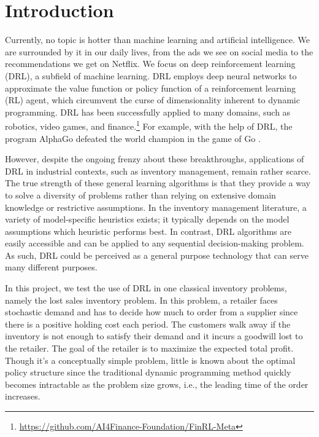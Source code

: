 
\section{Introduction}\label{intro}
Currently, no topic is hotter than machine learning and artificial intelligence. We are surrounded by it in our daily lives, from the ads we see on social media to the recommendations we get on Netflix. We focus on deep reinforcement learning (DRL), a subfield of machine learning. DRL employs deep neural networks to approximate the value function or policy function of a reinforcement learning (RL) agent, which circumvent the curse of dimensionality inherent to dynamic programming. DRL has been successfully applied to many domains, such as robotics, video games, and finance.\footnote{\url{https://github.com/AI4Finance-Foundation/FinRL-Meta}} For example, with the help of DRL, the program AlphaGo defeated the world champion in the game of Go \citep{silver_mastering_2016}.

However, despite the ongoing frenzy about these breakthroughs, applications of DRL in industrial contexts, such as inventory management, remain rather scarce. The true strength of these general learning algorithms is that they provide a way to solve a diversity of problems rather than relying on extensive domain knowledge or restrictive assumptions. In the inventory management literature, a variety of model-specific heuristics exists; it typically depends on the model assumptions which heuristic performs best. In contrast, DRL algorithms are easily accessible and can be applied to any sequential decision-making problem. As such, DRL could be perceived as a general purpose technology that can serve many different purposes.

In this project, we test the use of DRL in one classical inventory problems, namely the lost sales inventory problem. In this problem, a retailer faces stochastic demand and has to decide how much to order from a supplier since there is a positive holding cost each period. The customers walk away if the inventory is not enough to satisfy their demand and it incurs a goodwill lost to the retailer. The goal of the retailer is to maximize the expected total profit. Though it's a conceptually simple problem, little is known about the optimal policy structure since the traditional dynamic programming method quickly becomes intractable as the problem size grows, i.e., the leading time of the order increases.

